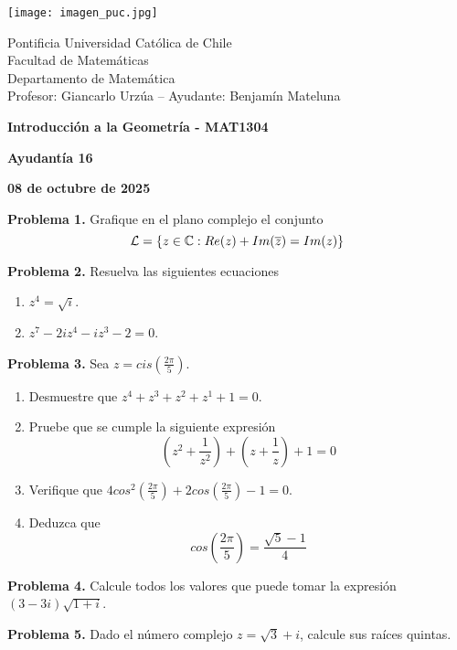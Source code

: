 \documentclass{article}
\begin{document}
\begin{minipage}{2.5cm}
    \texttt{[image: imagen\_puc.jpg]}
\end{minipage}
\begin{minipage}{14cm}
    {\sc Pontificia Universidad Católica de Chile\\
    Facultad de Matemáticas\\
    Departamento de Matemática\\
    Profesor: Giancarlo Urzúa -- Ayudante: Benjamín Mateluna}
\end{minipage}
\vspace{1ex}

{\centerline{\bf Introducción a la Geometría - MAT1304}
\centerline{\bf Ayudantía 16}}
\centerline{\bf 08 de octubre de 2025}

\vspace{1cm}
\noindent\textbf{Problema 1.} Grafique en el plano complejo el conjunto
\begin{equation*}
    \mathcal{L}=\{z\in\mathbb{C}:Re(z)+Im(\overline{z})=Im(z)\}
\end{equation*}

\vspace{5mm}
\noindent\textbf{Problema 2.} Resuelva las siguientes ecuaciones
\begin{enumerate}
    \item $z^{4}=\sqrt{i}$.
    \item $z^{7}-2iz^{4}-iz^{3}-2=0$.
\end{enumerate}

\vspace{5mm}
\noindent\textbf{Problema 3.} Sea $z=cis(\frac{2\pi}{5})$.
\begin{enumerate}
    \item Desmuestre que $z^{4}+z^{3}+z^{2}+z^{1}+1=0$.
    
    \item Pruebe que se cumple la siguiente expresión
    \begin{equation*}
        \left(z^{2}+\frac{1}{z^{2}}\right)+\left(z+\frac{1}{z}\right)+1=0
    \end{equation*}
    
    \item Verifique que $4cos^{2}(\frac{2\pi}{5})+2cos(\frac{2\pi}{5})-1=0$.
    
    \item Deduzca que
    \begin{equation*}
        cos\left(\frac{2\pi}{5}\right)=\frac{\sqrt{5}-1}{4}
    \end{equation*}
\end{enumerate}

\vspace{5mm}
\noindent\textbf{Problema 4.} Calcule todos los valores que puede tomar la expresión 
$(3-3i)\sqrt{1+i}$.

\vspace{5mm}
\noindent\textbf{Problema 5.} Dado el número complejo $z=\sqrt{3}+i$, calcule sus raíces quintas.

\end{document}
